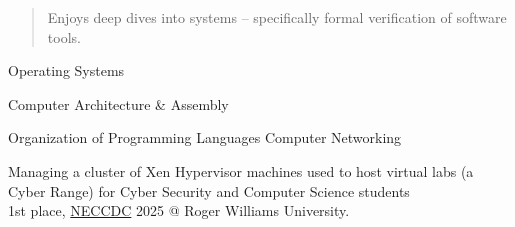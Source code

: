   \begin{quote}
    Enjoys deep dives into systems -- specifically formal verification of software tools.
  \end{quote}


  \smallskip{}

  \smallskip{}
  
  Operating Systems \par
  Computer Architecture \& Assembly \par
  Organization of Programming Languages
  Computer Networking
  

  Managing a cluster of Xen Hypervisor machines used to host virtual labs (a Cyber Range) for Cyber Security and Computer Science students
  \\
  1st place, \href{https://neccdl.org}{NECCDC} 2025 @ Roger Williams University.

